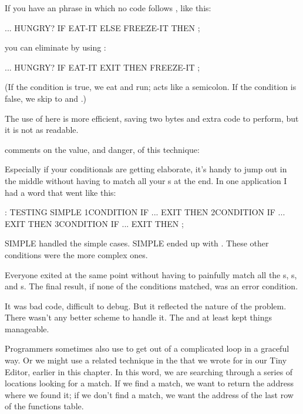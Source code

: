 If you have an  phrase in which no
code follows , like this:

\begin{Code}
... HUNGRY?  IF  EAT-IT  ELSE  FREEZE-IT  THEN ;
\end{Code}
you can eliminate  by using :

\begin{Code}
... HUNGRY?  IF EAT-IT EXIT  THEN  FREEZE-IT ;
\end{Code}
(If the condition is true, we eat and run;  acts like a
semicolon.  If the condition is false, we skip to  and
.)

The use of  here is more efficient, saving two bytes and
extra code to perform, but it is not as readable.%

\begin{interview}
 comments on the value, and
danger, of this technique:
\begin{tfquot}
Especially if your conditionals are getting elaborate, it's handy to jump
out in the middle without having to match all your s at the
end. In one application I had a word that went like this:

\begin{Code}
: TESTING
   SIMPLE  1CONDITION IF ... EXIT THEN
           2CONDITION IF ... EXIT THEN
           3CONDITION IF ... EXIT THEN ;
\end{Code}
SIMPLE handled the simple cases. SIMPLE ended up with .
These other conditions were the more complex ones.

Everyone exited at the same point without having to painfully match all
the s, s, and s. The final result, if
none of the conditions matched, was an error condition.

It was bad code, difficult to debug. But it reflected the nature of the
problem. There wasn't any better scheme to handle it. The 
and  at least kept things manageable.
\end{tfquot}
\end{interview}
Programmers sometimes also use  to get out of a complicated
 loop in a graceful way. Or we might use a related technique
in the  that we wrote for  in
our Tiny Editor, earlier in this chapter. In this word, we are searching
through a series of locations looking for a match. If we find a match, we
want to return the address where we found it; if we don't find a match, we
want the address of the last row of the functions table.

